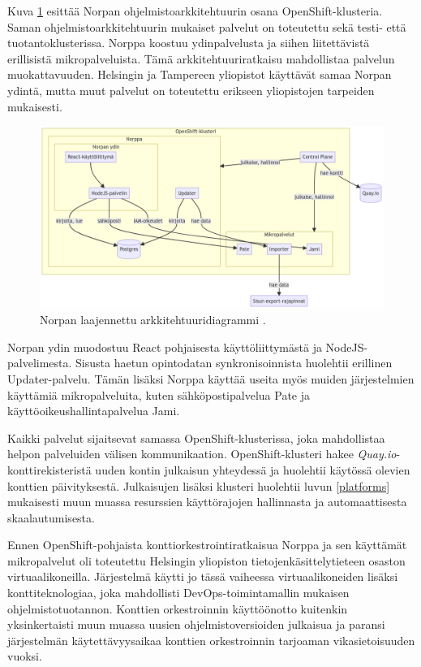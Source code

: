 Kuva \ref{fig:norppa:architecture} esittää Norpan ohjelmistoarkkitehtuurin osana OpenShift-klusteria.
Saman ohjelmistoarkkitehtuurin mukaiset palvelut on toteutettu sekä testi- että tuotantoklusterissa.
Norppa koostuu ydinpalvelusta ja siihen liitettävistä erillisistä mikropalveluista.
Tämä arkkitehtuuriratkaisu mahdollistaa palvelun muokattavuuden.
Helsingin ja Tampereen yliopistot käyttävät samaa Norpan ydintä, mutta muut palvelut on toteutettu erikseen yliopistojen tarpeiden mukaisesti.

\begin{figure}[ht]
\begin{center}
\includegraphics[width=1\textwidth]{figures/norppa_architecture.png}
\caption{Norpan laajennettu arkkitehtuuridiagrammi \cite{Norppa23}\label{fig:norppa:architecture}.}
\end{center}
\end{figure}

Norpan ydin muodostuu React pohjaisesta käyttöliittymästä ja NodeJS-palvelimesta.
Sisusta haetun opintodatan synkronisoinnista huolehtii erillinen Updater-palvelu.
Tämän lisäksi Norppa käyttää useita myös muiden järjestelmien käyttämiä mikropalveluita, kuten sähköpostipalvelua Pate ja käyttöoikeushallintapalvelua Jami.

Kaikki palvelut sijaitsevat samassa OpenShift-klusterissa, joka mahdollistaa helpon palveluiden välisen kommunikaation.
OpenShift-klusteri hakee \textit{Quay.io}-konttirekisteristä uuden kontin julkaisun yhteydessä ja huolehtii käytössä olevien konttien päivityksestä.
Julkaisujen lisäksi klusteri huolehtii luvun \ref{platforms} mukaisesti muun muassa resurssien käyttörajojen hallinnasta ja automaattisesta skaalautumisesta.

Ennen OpenShift-pohjaista konttiorkestrointiratkaisua Norppa ja sen käyttämät mikropalvelut oli toteutettu Helsingin yliopiston tietojenkäsittelytieteen osaston virtuaalikoneilla.
Järjestelmä käytti jo tässä vaiheessa virtuaalikoneiden lisäksi konttiteknologiaa, joka mahdollisti DevOps-toimintamallin mukaisen ohjelmistotuotannon.
Konttien orkestroinnin käyttöönotto kuitenkin yksinkertaisti muun muassa uusien ohjelmistoversioiden julkaisua ja paransi järjestelmän käytettävyysaikaa konttien orkestroinnin tarjoaman vikasietoisuuden vuoksi.

